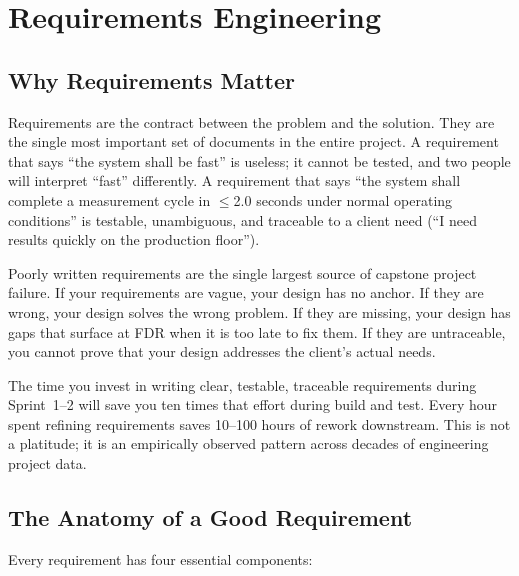 \chapter{Requirements Engineering}

\section{Why Requirements Matter}
Requirements are the contract between the problem and the solution. They are the single most important set of documents in the entire project. A requirement that says ``the system shall be fast'' is useless; it cannot be tested, and two people will interpret ``fast'' differently. A requirement that says ``the system shall complete a measurement cycle in $\leq$2.0 seconds under normal operating conditions'' is testable, unambiguous, and traceable to a client need (``I need results quickly on the production floor'').

Poorly written requirements are the single largest source of capstone project failure. If your requirements are vague, your design has no anchor. If they are wrong, your design solves the wrong problem. If they are missing, your design has gaps that surface at FDR when it is too late to fix them. If they are untraceable, you cannot prove that your design addresses the client's actual needs.

The time you invest in writing clear, testable, traceable requirements during Sprint~1--2 will save you ten times that effort during build and test. Every hour spent refining requirements saves 10--100 hours of rework downstream. This is not a platitude; it is an empirically observed pattern across decades of engineering project data.

\section{The Anatomy of a Good Requirement}
Every requirement has four essential components:

